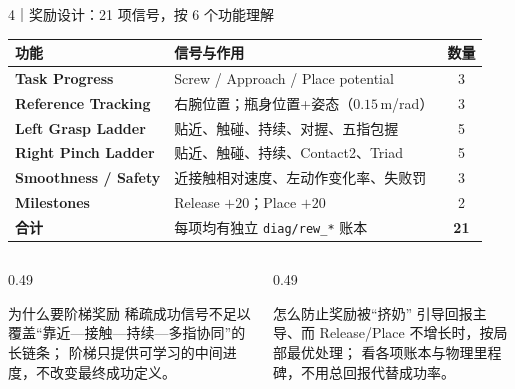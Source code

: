 \documentclass[aspectratio=169,10pt]{ctexbeamer}
\begin{document}
\begin{frame}[t]{4｜奖励设计：21 项信号，按 6 个功能理解}
  \small
  \begin{tabularx}{\textwidth}{@{}>{\bfseries}p{}Xc@{}}
    \toprule
    功能 & 信号与作用 & 数量\\
    \midrule
    Task Progress & Screw / Approach / Place potential & 3\\
    Reference Tracking & 右腕位置；瓶身位置+姿态（$0.15$\,m/rad） & 3\\
    Left Grasp Ladder & 贴近、触碰、持续、对握、五指包握 & 5\\
    Right Pinch Ladder & 贴近、触碰、持续、Contact2、Triad & 5\\
    Smoothness / Safety & 近接触相对速度、左动作变化率、失败罚 & 3\\
    Milestones & Release $+20$；Place $+20$ & 2\\
    \midrule
    合计 & 每项均有独立 \texttt{diag/rew\_*} 账本 & \textbf{21}\\
    \bottomrule
  \end{tabularx}

  \vspace{0.45em}
  \begin{columns}[T,onlytextwidth]
    \begin{column}{0.49\textwidth}
      \begin{block}{为什么要阶梯奖励}
        稀疏成功信号不足以覆盖“靠近—接触—持续—多指协同”的长链条；
        阶梯只提供可学习的中间进度，不改变最终成功定义。
      \end{block}
    \end{column}
    \begin{column}{0.49\textwidth}
      \begin{alertblock}{怎么防止奖励被“挤奶”}
        引导回报主导、而 Release/Place 不增长时，按局部最优处理；
        看各项账本与物理里程碑，不用总回报代替成功率。
      \end{alertblock}
    \end{column}
  \end{columns}
\end{frame}
\end{document}
